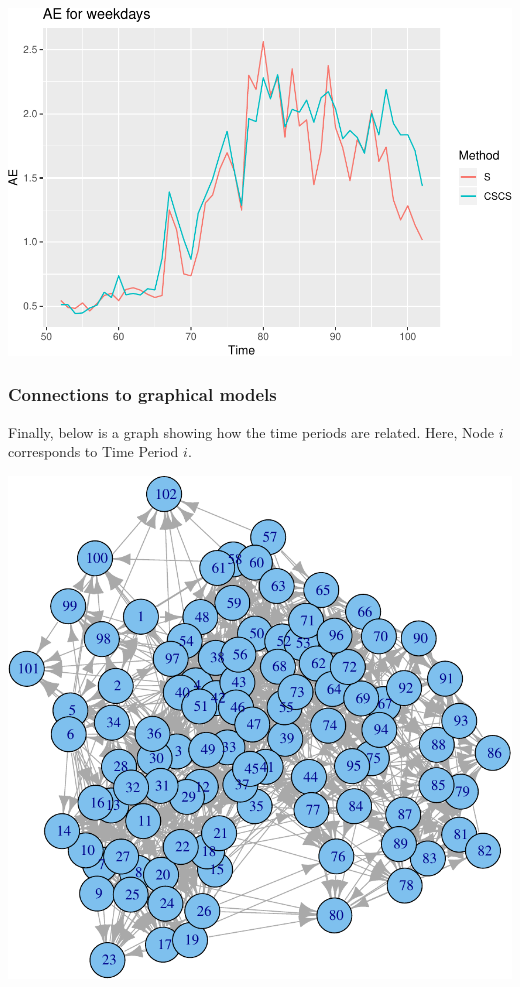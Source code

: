 \documentclass[]{article}
\begin{document}
\includegraphics{call_center_data_files/figure-latex/weekdaycont-1.pdf}

\subsubsection{Connections to graphical
models}\label{connections-to-graphical-models}

Finally, below is a graph showing how the time periods are related.
Here, Node \(i\) corresponds to Time Period \(i\).

\includegraphics{call_center_data_files/figure-latex/graph-1.pdf}
\end{document}
